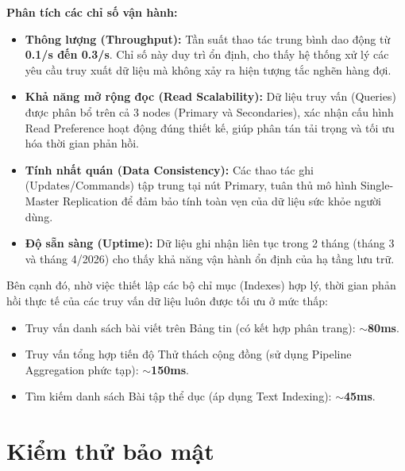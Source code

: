 \textbf{Phân tích các chỉ số vận hành:}
\begin{itemize}
    \item \textbf{Thông lượng (Throughput):} Tần suất thao tác trung bình dao động từ \textbf{0.1/s đến 0.3/s}. Chỉ số này duy trì ổn định, cho thấy hệ thống xử lý các yêu cầu truy xuất dữ liệu mà không xảy ra hiện tượng tắc nghẽn hàng đợi.
    \item \textbf{Khả năng mở rộng đọc (Read Scalability):} Dữ liệu truy vấn (Queries) được phân bổ trên cả 3 nodes (Primary và Secondaries), xác nhận cấu hình Read Preference hoạt động đúng thiết kế, giúp phân tán tải trọng và tối ưu hóa thời gian phản hồi.
    \item \textbf{Tính nhất quán (Data Consistency):} Các thao tác ghi (Updates/Commands) tập trung tại nút Primary, tuân thủ mô hình Single-Master Replication để đảm bảo tính toàn vẹn của dữ liệu sức khỏe người dùng.
    \item \textbf{Độ sẵn sàng (Uptime):} Dữ liệu ghi nhận liên tục trong 2 tháng (tháng 3 và tháng 4/2026) cho thấy khả năng vận hành ổn định của hạ tầng lưu trữ.
\end{itemize}

Bên cạnh đó, nhờ việc thiết lập các bộ chỉ mục (Indexes) hợp lý, thời gian phản hồi thực tế của các truy vấn dữ liệu luôn được tối ưu ở mức thấp:
\begin{itemize}
    \item Truy vấn danh sách bài viết trên Bảng tin (có kết hợp phân trang): \textbf{$\sim$80ms}.
    \item Truy vấn tổng hợp tiến độ Thử thách cộng đồng (sử dụng Pipeline Aggregation phức tạp): \textbf{$\sim$150ms}.
    \item Tìm kiếm danh sách Bài tập thể dục (áp dụng Text Indexing): \textbf{$\sim$45ms}.
\end{itemize}

\section{Kiểm thử bảo mật}
\label{sec:test_security}

